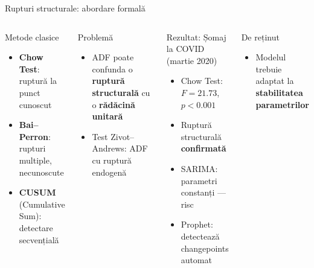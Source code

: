 \documentclass[9pt, aspectratio=169, t]{beamer}
\begin{document}
\begin{frame}{Rupturi structurale: abordare formală}
    \begin{columns}[T]
        \begin{block}{Metode clasice}
            \begin{itemize}\setlength{\itemsep}{0pt}
                \item \textbf{Chow Test}: ruptură la punct cunoscut
                \item \textbf{Bai--Perron}: rupturi multiple, necunoscute
                \item \textbf{CUSUM} (Cumulative Sum): detectare secvențială
            \end{itemize}
        \end{block}

        \vspace{0.1cm}

        \begin{alertblock}{Problemă}
            \begin{itemize}\setlength{\itemsep}{0pt}
                \item ADF poate confunda o \textbf{ruptură structurală} cu o \textbf{rădăcină unitară}
                \item Test Zivot--Andrews: ADF cu ruptură endogenă
            \end{itemize}
        \end{alertblock}

        \begin{exampleblock}{Rezultat: Șomaj la COVID (martie 2020)}
            \begin{itemize}\setlength{\itemsep}{0pt}
                \item Chow Test: $F = 21.73$, $p < 0.001$
                \item Ruptură structurală \textbf{confirmată}
                \item SARIMA: parametri constanți --- risc
                \item Prophet: detectează changepoints automat
            \end{itemize}
        \end{exampleblock}

        \vspace{0.1cm}

        \begin{block}{De reținut}
            \begin{itemize}\setlength{\itemsep}{0pt}
                \item Modelul trebuie adaptat la \textbf{stabilitatea parametrilor}
            \end{itemize}
        \end{block}
    \end{columns}
\end{frame}
\end{document}
